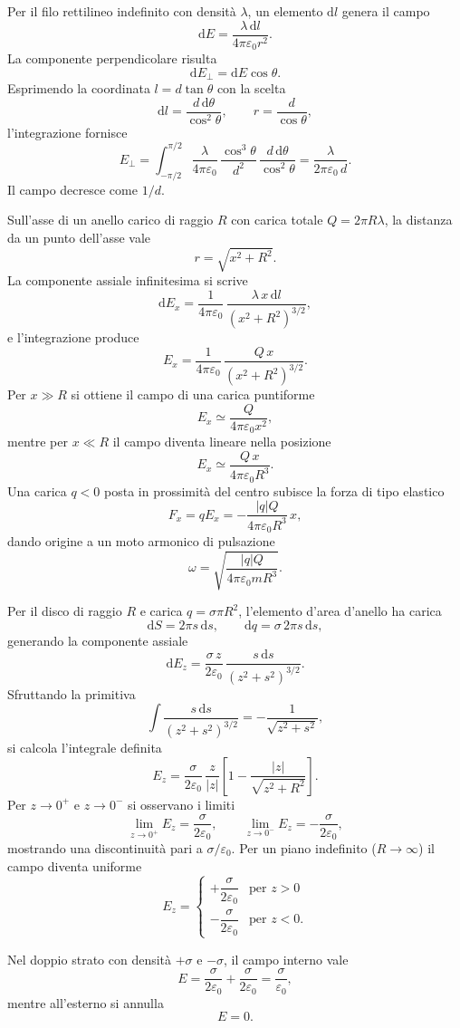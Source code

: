 \documentclass[11pt,a4paper]{article}
\newcommand{\dd}{\mathrm{d}}
\newcommand{\epz}{\varepsilon_0}
\begin{document}
Per il filo rettilineo indefinito con densità $\lambda$, un elemento $\dd l$ genera il campo
\[
\dd E=\frac{\lambda\,\dd l}{4\pi\epz r^2}.
\]
La componente perpendicolare risulta
\[
\dd E_\perp=\dd E\cos\theta.
\]
Esprimendo la coordinata $l=d\tan\theta$ con la scelta
\[
\dd l=\frac{d\,\dd\theta}{\cos^2\theta}, \qquad r=\frac{d}{\cos\theta},
\]
l'integrazione fornisce
\[
E_\perp=\int_{-\pi/2}^{\pi/2}\frac{\lambda}{4\pi\epz}\,\frac{\cos^3\theta}{d^2}\,\frac{d\,\dd\theta}{\cos^2\theta}
=\frac{\lambda}{2\pi\epz\,d}.
\]
Il campo decresce come $1/d$.

Sull'asse di un anello carico di raggio $R$ con carica totale $Q=2\pi R\lambda$, la distanza da un punto dell'asse vale
\[
r=\sqrt{x^2+R^2}.
\]
La componente assiale infinitesima si scrive
\[
\dd E_x=\frac{1}{4\pi\epz}\,\frac{\lambda\,x\,\dd l}{(x^2+R^2)^{3/2}} ,
\]
e l'integrazione produce
\[
E_x=\frac{1}{4\pi\epz}\,\frac{Q\,x}{(x^2+R^2)^{3/2}} .
\]
Per $x\gg R$ si ottiene il campo di una carica puntiforme
\[
E_x\simeq\frac{Q}{4\pi\epz x^2},
\]
mentre per $x\ll R$ il campo diventa lineare nella posizione
\[
E_x\simeq\frac{Q\,x}{4\pi\epz R^3}.
\]
Una carica $q<0$ posta in prossimità del centro subisce la forza di tipo elastico
\[
F_x=qE_x=-\frac{|q|Q}{4\pi\epz R^3}\,x,
\]
dando origine a un moto armonico di pulsazione
\[
\omega=\sqrt{\frac{|q|Q}{4\pi\epz mR^3}}.
\]

Per il disco di raggio $R$ e carica $q=\sigma\pi R^2$, l'elemento d'area d'anello ha carica
\[
\dd S=2\pi s\,\dd s, \qquad \dd q=\sigma\,2\pi s\,\dd s,
\]
generando la componente assiale
\[
\dd E_z=\frac{\sigma\,z}{2\epz}\,\frac{s\,\dd s}{(z^2+s^2)^{3/2}} .
\]
Sfruttando la primitiva
\[
\int\frac{s\,\dd s}{(z^2+s^2)^{3/2}}=-\frac{1}{\sqrt{z^2+s^2}},
\]
si calcola l'integrale definita
\[
E_z=\frac{\sigma}{2\epz}\,\frac{z}{|z|}\left[1-\frac{|z|}{\sqrt{z^2+R^2}}\right].
\]
Per $z\to 0^{+}$ e $z\to 0^{-}$ si osservano i limiti
\[
\lim_{z\to 0^{+}} E_z = \frac{\sigma}{2\epz}, \qquad \lim_{z\to 0^{-}} E_z = -\frac{\sigma}{2\epz},
\]
mostrando una discontinuità pari a $\sigma/\epz$. Per un piano indefinito ($R\to\infty$) il campo diventa uniforme
\[
E_z = \begin{cases} +\dfrac{\sigma}{2\epz} & \text{per } z>0 \\[1.5ex] -\dfrac{\sigma}{2\epz} & \text{per } z<0. \end{cases}
\]

Nel doppio strato con densità $+\sigma$ e $-\sigma$, il campo interno vale
\[
E=\frac{\sigma}{2\epz}+\frac{\sigma}{2\epz}=\frac{\sigma}{\epz},
\]
mentre all'esterno si annulla
\[
E=0.
\]
\end{document}
